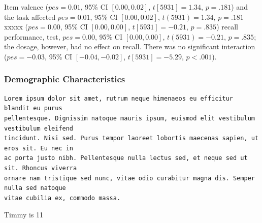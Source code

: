 \documentclass{article}
\begin{document}
Item valence (\(pes = 0.01\), 95\% CI \([0.00, 0.02]\),
\(t[5931] = 1.34\), \(p = .181\)) and the task affected \(pes = 0.01\),
95\% CI \([0.00, 0.02]\), \(t(5931) = 1.34\), \(p = .181\) xxxxx
(\(pes = 0.00\), 95\% CI \([0.00, 0.00]\), \(t[5931] = -0.21\),
\(p = .835\)) recall performance, test, \(pes = 0.00\), 95\% CI
\([0.00, 0.00]\), \(t(5931) = -0.21\), \(p = .835\); the dosage,
however, had no effect on recall. There was no significant interaction
(\(pes = -0.03\), 95\% CI \([-0.04, -0.02]\), \(t[5931] = -5.29\),
\(p < .001\)).

\hypertarget{demographic-characteristics}{%
\subsubsection{Demographic
Characteristics}\label{demographic-characteristics}}

\begin{verbatim}
Lorem ipsum dolor sit amet, rutrum neque himenaeos eu efficitur blandit eu purus
pellentesque. Dignissim natoque mauris ipsum, euismod elit vestibulum vestibulum eleifend
tincidunt. Nisi sed. Purus tempor laoreet lobortis maecenas sapien, ut eros sit. Eu nec in
ac porta justo nibh. Pellentesque nulla lectus sed, et neque sed ut sit. Rhoncus viverra
ornare nam tristique sed nunc, vitae odio curabitur magna dis. Semper nulla sed natoque
vitae cubilia ex, commodo massa.
\end{verbatim}

Timmy is 11
\end{document}
